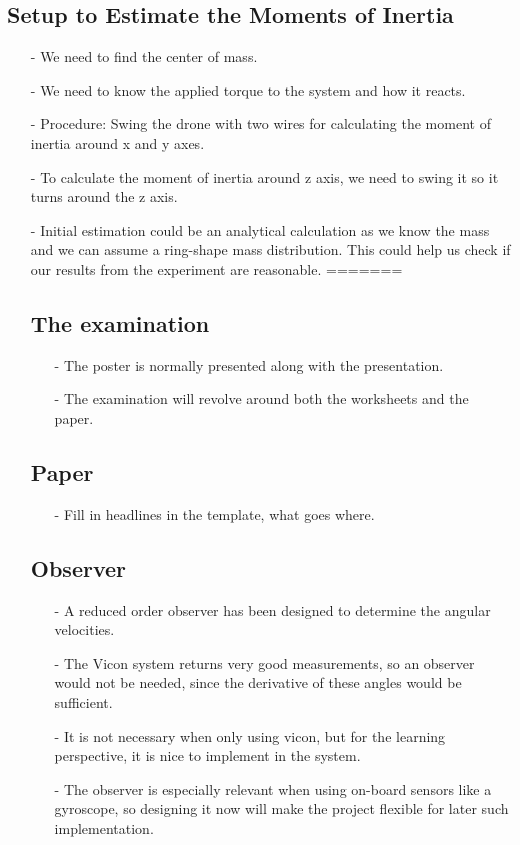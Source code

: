 \subsection{Setup to Estimate the Moments of Inertia}
\begin{itemize}
  \item[-] We need to find the center of mass.
  \item[-] We need to know the applied torque to the system and how it reacts.
  \item[-] Procedure: Swing the drone with two wires for calculating the moment of inertia around x and y axes.
  \item[-] To calculate the moment of inertia around z axis, we need to swing it so it turns around the z axis.
  \item[-] Initial estimation could be an analytical calculation as we know the mass and we can assume a ring-shape mass distribution. This could help us check if our results from the experiment are reasonable.
=======
\subsection{The examination}
\begin{itemize}
  \item[-] The poster is normally presented along with the presentation.
  \item[-] The examination will revolve around both the worksheets and the paper.
\end{itemize}

\subsection{Paper}
\begin{itemize}
  \item[-] Fill in headlines in the template, what goes where.
\end{itemize}

\subsection{Observer}
\begin{itemize}
  \item[-] A reduced order observer has been designed to determine the angular velocities.
  \item[-] The Vicon system returns very good measurements, so an observer would not be needed, since the derivative of these angles would be sufficient.
  \item[-] It is not necessary when only using vicon, but for the learning perspective, it is nice to implement in the system.
  \item[-] The observer is especially relevant when using on-board sensors like a gyroscope, so designing it now will make the project flexible for later such implementation.
\end{itemize}


\end{itemize}
